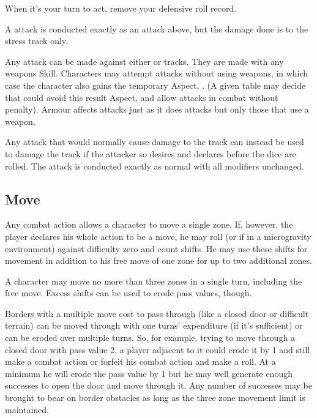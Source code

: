 When it's your turn to act, remove your defensive roll record.



A \Composure{} attack is conducted exactly as an attack above, but the damage done is to the \Composure{} stress track only.

Any attack can be made against either \Composure{} or \Health{} tracks. They are made with any weapons Skill. Characters may attempt \Composure{} attacks without using weapons, in which case the character also gains the temporary Aspect, . (A given table may decide that  could avoid this result Aspect, and allow  attacks in combat without penalty). Armour affects \Composure{} attacks just as it does \Health{} attacks but only those that use a weapon.

Any attack that would normally cause damage to the \Health{} track can instead be used to damage the \Composure{} track if the attacker so desires and declares before the dice are rolled. The attack is conducted exactly as normal with all modifiers unchanged.

\subsection{Move}\label{sec:personal-combat-move}

Any combat action allows a character to move a single zone. If, however, the player declares his whole action to be a move, he may roll  (or  if in a microgravity environment) against difficulty zero and count shifts. He may use these shifts for movement in addition to his free move of one zone for up to two additional zones.

A character may move no more than three zones in a single turn, including the free move. Excess shifts can be used to erode pass values, though.

Borders with a multiple move cost to pass through (like a closed door or difficult terrain) can be moved through with one turns' expenditure (if it's sufficient) or can be eroded over multiple turns. So, for example, trying to move through a closed door with pass value 2, a player adjacent to it could erode it by 1 and still make a combat action or forfeit his combat action and make a  roll. At a minimum he will erode the pass value by 1 but he may well generate enough successes to open the door and move through it. Any number of successes may be brought to bear on border obstacles as long as the three zone movement limit is maintained.
\vfil


